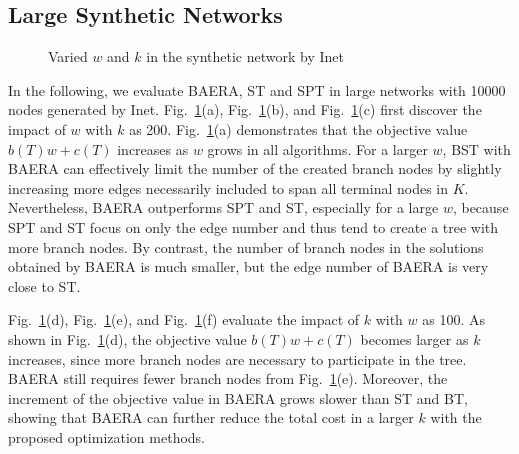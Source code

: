 \documentclass[conference]{IEEEtran}
\begin{document}
\subsection{Large Synthetic Networks}

\begin{figure}[t]
  \newline
{}  \newline
{} 
\caption{Varied $w$ and $k$ in the synthetic network by Inet}
\label{fig:synthetic_w_k}
\end{figure}

In the following, we evaluate BAERA, ST and SPT in large networks with 10000
nodes generated by Inet. Fig.~\ref{fig:synthetic_w_k}(a), Fig.~\ref {fig:synthetic_w_k}(b), and Fig.~\ref{fig:synthetic_w_k}(c) first discover
the impact of $w$ with $k$ as 200. Fig.~\ref{fig:synthetic_w_k}(a)
demonstrates that the objective value $b(T)w+c(T)$ increases as $w$ grows in
all algorithms. For a larger $w$, BST with BAERA can effectively limit the number of the created branch
nodes by slightly increasing more edges necessarily included to span all terminal nodes in $K$. Nevertheless, BAERA outperforms
SPT and ST, especially for a large $w$, because SPT and ST focus on only the
edge number and thus tend to create a tree with more branch nodes. By
contrast, the number of branch nodes in the solutions obtained by BAERA is
much smaller, but the edge number of BAERA is very close to ST.

Fig.~\ref{fig:synthetic_w_k}(d), Fig.~\ref{fig:synthetic_w_k}(e), and Fig.~\ref{fig:synthetic_w_k}(f) evaluate the impact of $k$ with $w$ as 100. As
shown in Fig.~\ref{fig:synthetic_w_k}(d), the objective value $b(T)w+c(T)$
becomes larger as $k$ increases, since more branch nodes are necessary to
participate in the tree. BAERA still requires fewer branch nodes from Fig.~\ref{fig:synthetic_w_k}(e). Moreover,
the increment of the objective value in BAERA grows slower than ST and BT,
showing that BAERA can further reduce the total cost in a larger $k$ with the proposed optimization methods.
\end{document}
